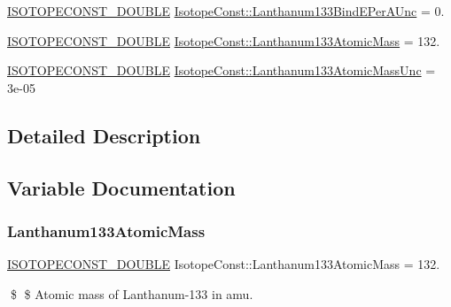 \begin{DoxyCompactItemize}
\mbox{\hyperlink{group___isotope_const-_macros_ga8f45a7272ce02c0b4c65c44636ed719a}{I\+S\+O\+T\+O\+P\+E\+C\+O\+N\+S\+T\+\_\+\+D\+O\+U\+B\+LE}} \mbox{\hyperlink{group___isotope_const-_lanthanum-_la133_ga2eabaae4c250b14fd2b673bb55e26082}{Isotope\+Const\+::\+Lanthanum133\+Bind\+E\+Per\+A\+Unc}} = 0.
\item 
\mbox{\hyperlink{group___isotope_const-_macros_ga8f45a7272ce02c0b4c65c44636ed719a}{I\+S\+O\+T\+O\+P\+E\+C\+O\+N\+S\+T\+\_\+\+D\+O\+U\+B\+LE}} \mbox{\hyperlink{group___isotope_const-_lanthanum-_la133_ga96ebaaee912712e351a07a17a7cdfb86}{Isotope\+Const\+::\+Lanthanum133\+Atomic\+Mass}} = 132.
\item 
\mbox{\hyperlink{group___isotope_const-_macros_ga8f45a7272ce02c0b4c65c44636ed719a}{I\+S\+O\+T\+O\+P\+E\+C\+O\+N\+S\+T\+\_\+\+D\+O\+U\+B\+LE}} \mbox{\hyperlink{group___isotope_const-_lanthanum-_la133_ga4b61cd304122a853e18fcbf209bdc20c}{Isotope\+Const\+::\+Lanthanum133\+Atomic\+Mass\+Unc}} = 3e-\/05
\end{DoxyCompactItemize}


\subsection{Detailed Description}


\subsection{Variable Documentation}
\mbox{\label{group___isotope_const-_lanthanum-_la133_ga96ebaaee912712e351a07a17a7cdfb86}} 
\subsubsection{\texorpdfstring{Lanthanum133\+Atomic\+Mass}{Lanthanum133AtomicMass}}
{\footnotesize\ttfamily \mbox{\hyperlink{group___isotope_const-_macros_ga8f45a7272ce02c0b4c65c44636ed719a}{I\+S\+O\+T\+O\+P\+E\+C\+O\+N\+S\+T\+\_\+\+D\+O\+U\+B\+LE}} Isotope\+Const\+::\+Lanthanum133\+Atomic\+Mass = 132.}

\$ \$ Atomic mass of Lanthanum-\/133 in amu. \mbox{\label{group___isotope_const-_lanthanum-_la133_ga4b61cd304122a853e18fcbf209bdc20c}} 
